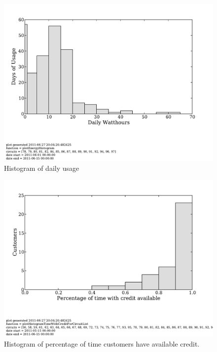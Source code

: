 \documentclass[conference]{IEEEtran}
\begin{document}
\begin{figure}[]
\begin{center}
\includegraphics[width=\columnwidth]{figures/ml06Histogram.pdf}
\end{center}
\caption{Histogram of daily usage}
\label{ml06Histogram}
\end{figure}

\begin{figure}[]
\begin{center}
\includegraphics[width=\columnwidth]{figures/creditHistogram.pdf}
\end{center}
\caption{Histogram of percentage of time customers have available credit.}
\label{creditHistogram}
\end{figure}





\end{document}
